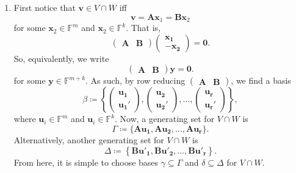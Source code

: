 \documentclass[../Notes.tex]{subfiles}
\begin{document}
\begin{stbox}{}
\begin{itemize}
\begin{enumerate}
            \item First notice that \(\mathbf{v} \in V\cap W\) iff
            \[\mathbf{v}=\mathbf{A}\mathbf{x}_1=\mathbf{B}\mathbf{x}_2\]
            for some \(\mathbf{x}_2\in \mathbb{F}^m\) and \(\mathbf{x}_2\in \mathbb{F}^k\). That is,
            \[\begin{pmatrix}
                \mathbf{A} & \mathbf{B} 
            \end{pmatrix}
            \begin{pmatrix}
                \mathbf{x_1}\\
                -\mathbf{x_2}
            \end{pmatrix}
            =\mathbf{0}.\]
            So, equivalently, we write
            \[\begin{pmatrix}
                \mathbf{A} & \mathbf{B} 
            \end{pmatrix}
            \mathbf{y}=\mathbf{0}.\]
            for some \(\mathbf{y}\in \mathbb{F}^{m+k}\). As such, by row reducing             
            \(\begin{pmatrix}
                \mathbf{A} & \mathbf{B} 
            \end{pmatrix}\), 
            we find a basis 
            \[\beta\coloneq\left\{
                \begin{pmatrix}
                    \mathbf{u_1}\\
                    \mathbf{u_1'}
                \end{pmatrix},
                \begin{pmatrix}
                    \mathbf{u_2}\\
                    \mathbf{u_2'}
                \end{pmatrix},\dots,
                \begin{pmatrix}
                    \mathbf{u_r}\\
                    \mathbf{u_r'}
                \end{pmatrix}
            \right\},\]
            where \(\mathbf{u}_i \in \mathbb{F}^m\) and \(\mathbf{u}_i \in \mathbb{F}^k\).
            Now, 
            a generating set for \(V\cap W\) is
            \[\Gamma\coloneq\{\mathbf{A}\mathbf{u_1},\mathbf{A}\mathbf{u_2},\dots,\mathbf{A}\mathbf{u_r}\}.\]
            Alternatively, 
            another generating set for \(V\cap W\) is
            \[\Delta\coloneq\left\{\mathbf{B}\mathbf{u'_1},\mathbf{B}\mathbf{u'_2},\dots,\mathbf{B}\mathbf{u'_r}\right\}.\]
            From here, it is simple to choose bases \(\gamma\subseteq\Gamma\) and \(\delta\subseteq\Delta\) for \(V\cap W\). 
            

\end{enumerate}
\end{itemize}
\end{stbox}
\end{document}
